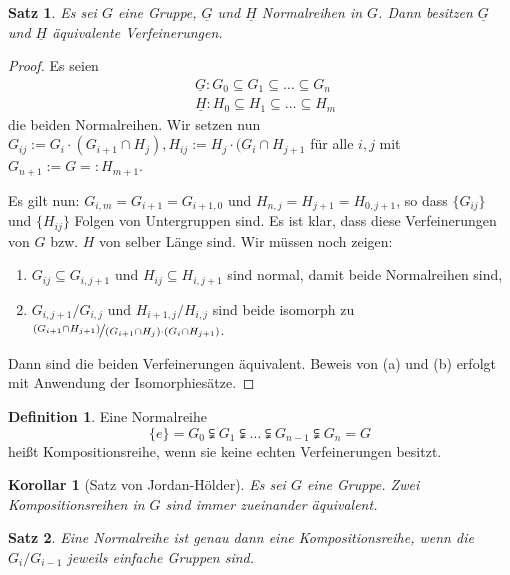 \documentclass[12pt]{scrartcl} %
\newtheorem{thm}{Satz}
\newtheorem{kor}{Korollar}
\theoremstyle{definition}
\newtheorem*{defn}{Definition}
\theoremstyle{remark}
\begin{document}
\begin{thm}
Es sei $G$ eine Gruppe, $\underline{G}$ und $\underline{H}$ Normalreihen in $G$. Dann besitzen $\underline{G}$ und $\underline{H}$ äquivalente Verfeinerungen.
\end{thm}

\begin{proof}
	Es seien 
	\[\begin{split}
			&\underline{G}: G_0\subseteq G_1 \subseteq\dots\subseteq G_n \\
			&\underline{H}: H_0\subseteq H_1\subseteq\dots\subseteq H_m 
		\end{split}\]
	die beiden Normalreihen. Wir setzen nun $G_{ij}:=G_i\cdot(G_{i+1}\cap H_j), H_{ij} := H_j\cdot(G_i\cap H_{j+1}$ für alle $i,j$ mit $G_{n+1}:=G=:H_{m+1}$.
	
	Es gilt nun: $G_{i,m}=G_{i+1}=G_{i+1,0}$ und $H_{n,j}=H_{j+1}=H_{0,j+1}$, so dass $\{G_{ij}\}$ und $\{H_{ij}\}$ Folgen von Untergruppen sind. Es ist klar, dass diese Verfeinerungen von $G$ bzw. $H$ von selber Länge sind. Wir müssen noch zeigen:
	\begin{enumerate}[label=(\alph*)]
		\item $G_{ij}\subseteq G_{i,j+1}$ und $H_{ij}\subseteq H_{i,j+1}$ sind normal, damit beide Normalreihen sind,
		\item $G_{i,j+1}/G_{i,j}$ und $H_{i+1,j}/H_{i,j}$ sind beide isomorph zu $\nicefrac{(G_{i+1}\cap H_{j+1})}{(G_{i+1}\cap H_{j})\cdot(G_{i}\cap H_{j+1})}$.
	\end{enumerate}
	Dann sind die beiden Verfeinerungen äquivalent. Beweis von (a) und (b) erfolgt mit Anwendung der Isomorphiesätze.
\end{proof}

\begin{defn}
	Eine Normalreihe 
		\[\{e\}=G_0\subsetneqq G_1 \subsetneqq\dots\subsetneqq G_{n-1}\subsetneqq G_n=G \]
	heißt Kompositionsreihe, wenn sie keine echten Verfeinerungen besitzt.
\end{defn}

\begin{kor}[Satz von Jordan-Hölder]
	Es sei $G$ eine Gruppe. Zwei Kompositionsreihen in $G$ sind immer zueinander äquivalent.
\end{kor}

\begin{thm}
	Eine Normalreihe ist genau dann eine Kompositionsreihe, wenn die $G_i/G_{i-1}$ jeweils einfache Gruppen sind.
\end{thm}
\end{document}
